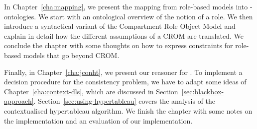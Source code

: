 In Chapter~\ref{cha:mapping}, we present the mapping from role-based models into
\LMLO-ontologies. We start with an ontological overview of the notion of a role.  We then introduce
a syntactical variant of the Compartment Role Object Model and explain in detail how the different
assumptions of a CROM are translated.  We conclude the chapter with some thoughts on how to express
constraints for role-based models that go beyond CROM.

Finally, in Chapter~\ref{cha:jconht}, we present our reasoner for \LMLO. To implement a decision
procedure for the consistency problem, we have to adapt some ideas of Chapter~\ref{cha:context-dls},
which are discussed in Section~\ref{sec:blackbox-approach}. Section~\ref{sec:using-hypertableau}
covers the analysis of the contextualised hypertableau algorithm. We finish the chapter with some
notes on the implementation and an evaluation of our implementation.




% 



